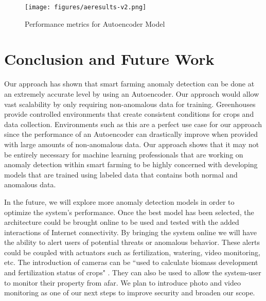     
    

\begin{figure}[t!]
    \centering
    \texttt{[image: figures/aeresults-v2.png]}
    \caption{Performance metrics for Autoencoder Model}
    \label{fig:aeresults}
\end{figure}


\section{Conclusion and Future Work}
\label{sec:conclusion}
Our approach has shown that smart farming anomaly detection can be done at an extremely accurate level by using an Autoencoder. Our approach would allow vast scalability by only requiring non-anomalous data for training. Greenhouses provide controlled environments that create consistent conditions for crops and data collection. Environments such as this are a perfect use case for our approach since the performance of an Autoencoder can drastically improve when provided with large amounts of non-anomalous data. Our approach shows that it may not be entirely necessary for machine learning professionals that are working on anomaly detection within smart farming to be highly concerned with developing models that are trained using labeled data that contains both normal and anomalous data. 

In the future, we will explore more anomaly detection models in order to optimize the system's performance. Once the best model has been selected, the architecture could be brought online to be used and tested with the added interactions of Internet connectivity. By bringing the system online we will have the ability to alert users of potential threats or anomalous behavior. These alerts could be coupled with actuators such as fertilization, watering, video monitoring, etc. The introduction of cameras can be ``used to calculate biomass development and fertilization status of crops" \cite{Walter6148}. They can also be used to allow the system-user to monitor their property from afar. We plan to introduce photo and video monitoring as one of our next steps to improve security and broaden our scope.

